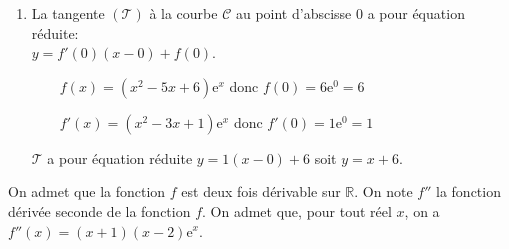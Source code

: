 \documentclass[10pt]{article}
\providecommand{\e}{{\mathrm{e}}}
\begin{document}
\begin{enumerate}
\begin{center}
{
\renewcommand{\arraystretch}{1.5}
\def\esp{\hspace*{2cm}}
$\begin{array}{|c | *{7}{c} |} 
\hline
x  & -\infty & \esp & \frac{3-\sqrt{5}}{2} & \esp & \frac{3+\sqrt{5}}{2} & \esp & +\infty \\
\hline
x^2-3x+1 &  & \pmb{+} &  \vline\hspace{-2.7pt}{0} & \pmb{-} & \vline\hspace{-2.7pt}{0} & \pmb{+} &\\
\hline
\e^x &  & \pmb{+} &  \vline\hspace{-2.7pt}{\phantom 0} & \pmb{+} & \vline\hspace{-2.7pt}{\phantom 0} & \pmb{+} &\\
\hline
f'(x) &  & \pmb{+} &  \vline\hspace{-2.7pt}{0} & \pmb{-} & \vline\hspace{-2.7pt}{0} & \pmb{+} & \\
\hline
f &  & \text{croissante} &  \vline\hspace{-2.7pt}{\phantom 0} & \text{décroissante} & \vline\hspace{-2.7pt}{\phantom 0} & \text{croissante} & \\
\hline
\end{array}$
}
\end{center}


\item La tangente $(\mathcal{T})$ à la courbe $\mathcal{C}$ au point d'abscisse 0 a pour équation réduite: \\
$y=f'(0)\left (x-0\right ) + f(0)$.

~~\textbullet~~$f(x)=\left (x^2-5x+6\right )\e^{x}$ donc $f(0)=6\e^{0}=6$

~~\textbullet~~$f'(x)=\left (x^2-3x+1\right )\e^{x}$ donc $f'(0)=1\e^{0}=1$

$\mathcal{T}$ a pour équation réduite $y=1\left (x-0\right )+6$ soit $y=x+6$.

\end{enumerate}

On admet que la fonction $f$ est deux fois dérivable sur $\mathbb{R}$. On note $f''$ la fonction dérivée seconde de la fonction $f$. On admet que, pour tout réel $x$, on a $f''(x) = (x + 1)(x - 2) \mathrm{e}^{x}$.
\end{document}
